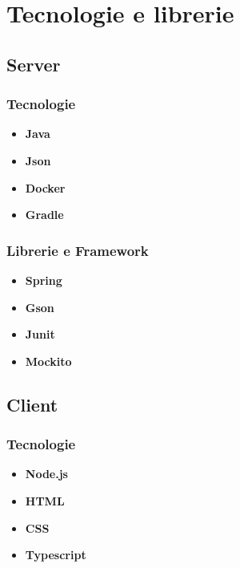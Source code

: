 \section{Tecnologie e librerie}




\subsection{Server}

\subsubsection{Tecnologie}

\begin{itemize}
	\item \textbf{Java}
	\item \textbf{Json}
	\item \textbf{Docker}
	\item \textbf{Gradle}
\end{itemize}

\subsubsection{Librerie e Framework}

\begin{itemize}
	\item \textbf{Spring}
	\item \textbf{Gson}
	\item \textbf{Junit}
	\item \textbf{Mockito}

\end{itemize}




\subsection{Client}

\subsubsection{Tecnologie}

\begin{itemize}
	\item \textbf{Node.js}
	\item \textbf{HTML}
	\item \textbf{CSS}
	\item \textbf{Typescript}

\end{itemize}

